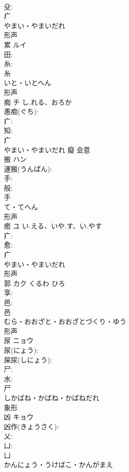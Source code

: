 \documentclass[8pt]{extreport}
\begin{document}
\begin{CJK}{UTF8}{min}
\\	殳: 
\\	疒	
\\	やまい・やまいだれ	
\\	形声 
\\	累	ルイ			
\\	田: 
\\	糸: 
\\	糸	
\\	いと・いとへん	
\\	形声 
\\	痴	チ	し.れる、おろか		
\\	愚痴(ぐち): 
\\	疒: 
\\	知: 
\\	疒	
\\	やまい・やまいだれ	癡	会意 
\\	搬	ハン			
\\	運搬(うんぱん): 
\\	手: 
\\	般: 
\\	手	
\\	て・てへん	
\\	形声 
\\	癒	ユ	い.える、いや.す、い.やす		
\\	疒: 
\\	愈: 
\\	疒	
\\	やまい・やまいだれ	
\\	形声 
\\	郭	カク	くるわ	ひろ	
\\	享: 
\\	邑: 
\\	邑	
\\	むら・おおざと・おおざとづくり・ゆう	
\\	形声 
\\	尿	ニョウ			
\\	尿(にょう): 
\\	屎尿(しにょう): 
\\	尸: 
\\	水: 
\\	尸	
\\	しかばね・かばね・かばねだれ	
\\	象形 
\\	凶	キョウ			
\\	凶作(きょうさく): 
\\	乂: 
\\	凵: 
\\	凵	
\\	かんにょう・うけばこ・かんがまえ	

\end{CJK}
\end{document}
